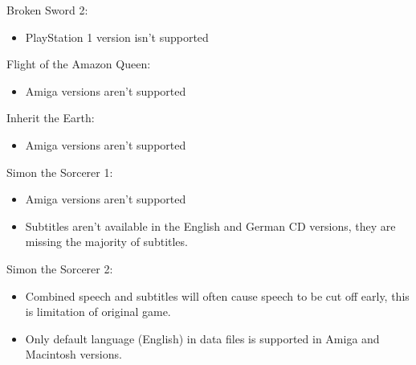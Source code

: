 Broken Sword 2:
  \begin{itemize}
  \item PlayStation 1 version isn't supported
  \end{itemize}
Flight of the Amazon Queen:
  \begin{itemize}
  \item Amiga versions aren't supported
  \end{itemize}
Inherit the Earth:
  \begin{itemize}
  \item Amiga versions aren't supported
  \end{itemize}
Simon the Sorcerer 1:
  \begin{itemize}
  \item Amiga versions aren't supported
  \item Subtitles aren't available in the English and German CD versions,
                 they are missing the majority of subtitles.
  \end{itemize}
Simon the Sorcerer 2:
  \begin{itemize}
  \item Combined speech and subtitles will often cause speech to be
                 cut off early, this is limitation of original game.
  \item Only default language (English) in data files is supported
                 in Amiga and Macintosh versions.
  \end{itemize}

